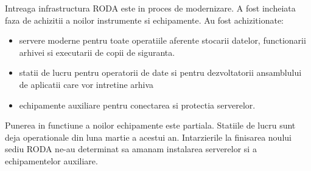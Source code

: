 
\medskip

Intreaga infrastructura RODA este in proces de modernizare. 
A fost incheiata faza de achizitii a noilor instrumente si echipamente. 
Au fost achizitionate:
\begin{itemize}
\item servere moderne pentru toate operatiile aferente stocarii datelor,
functionarii arhivei si executarii de copii de siguranta.
\item statii de lucru pentru operatorii de date si pentru dezvoltatorii
ansamblului de aplicatii care vor intretine arhiva
\item echipamente auxiliare pentru conectarea si protectia serverelor.
\end{itemize}

Punerea in functiune a noilor echipamente este partiala. 
Statiile de lucru sunt deja operationale din luna martie a acestui an. 
Intarzierile la finisarea noului sediu RODA ne-au determinat sa amanam instalarea serverelor si a
echipamentelor auxiliare.

